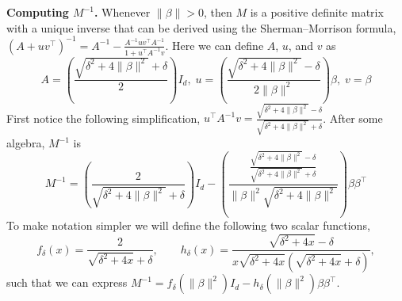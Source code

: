 \documentclass{article}
\theoremstyle{plain}
\theoremstyle{definition}
\theoremstyle{remark}
\begin{document}
\textbf{Computing $M^{-1}$.}
%
Whenever $\|\beta\| > 0$, then $M$ is a positive definite matrix with a unique inverse that can be derived using the Sherman–Morrison formula, $(A + uv^\intercal)^{-1} = A^{-1} - \tfrac{A^{-1}uv^\intercal A^{-1}}{1 + u^\intercal A^{-1}v}$. Here we can define $A$, $u$, and $v$ as
\begin{equation}
    A = \left(\frac{\sqrt{\delta^2 + 4\|\beta\|^2} + \delta}{2}\right)I_d,\;
    u = \left(\frac{\sqrt{\delta^2 + 4\|\beta\|^2} - \delta}{2\|\beta\|^2}\right)\beta,\;
    v = \beta
\end{equation}
First notice the following simplification, $u^\intercal A^{-1}v = \frac{\sqrt{\delta^2 + 4\|\beta\|^2} - \delta}{\sqrt{\delta^2 + 4\|\beta\|^2} + \delta}$.
%
After some algebra, $M^{-1}$ is
\begin{equation}
    M^{-1} = \left(\frac{2}{\sqrt{\delta^2 + 4\|\beta\|^2} + \delta}\right)I_d - \left(\frac{\frac{\sqrt{\delta^2 + 4\|\beta\|^2} - \delta}{\sqrt{\delta^2 + 4\|\beta\|^2} + \delta}}{\|\beta\|^2\sqrt{\delta^2 + 4\|\beta\|^2}}\right)\beta\beta^\intercal
\end{equation}
To make notation simpler we will define the following two scalar functions,
\begin{equation}
    \label{eq:f-defn-M-inv-two-layer}
    f_\delta(x) = \frac{2}{\sqrt{\delta^2 + 4x} + \delta},\qquad
    h_\delta(x) = \frac{\sqrt{\delta^2 + 4x} - \delta}{x\sqrt{\delta^2 + 4x}\left(\sqrt{\delta^2 + 4x} + \delta\right)},
\end{equation}
such that we can express $M^{-1} = f_\delta\left(\|\beta\|^2\right)I_d - h_\delta\left(\|\beta\|^2\right)\beta\beta^\intercal$.
\end{document}
